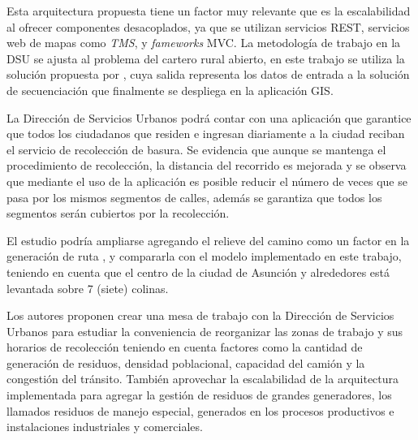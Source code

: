 \documentclass[spanish, conference]{IEEEtran}
\begin{document}
Esta arquitectura propuesta tiene un factor muy relevante que es la escalabilidad al ofrecer componentes desacoplados, ya que se utilizan servicios REST, servicios web de mapas como \textit{TMS}, y \textit{fameworks} MVC. La metodología de trabajo en la DSU se ajusta al problema del cartero rural abierto, en este trabajo se utiliza la solución propuesta por \cite{Braier2017AnArgentina}, cuya salida representa los datos de entrada a la solución de secuenciación que finalmente se despliega en la aplicación GIS.

La Dirección de Servicios Urbanos podrá contar con una aplicación que garantice que todos los ciudadanos que residen e ingresan diariamente a la ciudad reciban el servicio de recolección de basura. Se evidencia que aunque se mantenga el procedimiento de recolección, la distancia del recorrido es mejorada y se observa que mediante el uso de la aplicación es posible reducir el número de veces que se pasa por los mismos segmentos de calles, además se garantiza que todos los segmentos serán cubiertos por la recolección.

El estudio podría ampliarse agregando el relieve del camino como un factor en la generación de ruta \cite{Sulemana2018OptimalMethods}, y compararla con el modelo implementado en este trabajo, teniendo en cuenta que el centro de la ciudad de Asunción y alrededores está levantada sobre 7 (siete) colinas.

Los autores proponen crear una mesa de trabajo con la Dirección de Servicios Urbanos para estudiar la conveniencia de reorganizar las zonas de trabajo y sus horarios de recolección teniendo en cuenta factores como la cantidad de generación de residuos, densidad poblacional, capacidad del camión y la congestión del tránsito. También aprovechar la escalabilidad de la arquitectura implementada para agregar la gestión de residuos de grandes generadores, los llamados residuos de manejo especial, generados en los procesos productivos e instalaciones industriales y comerciales.







\vspace{12pt}
\end{document}
